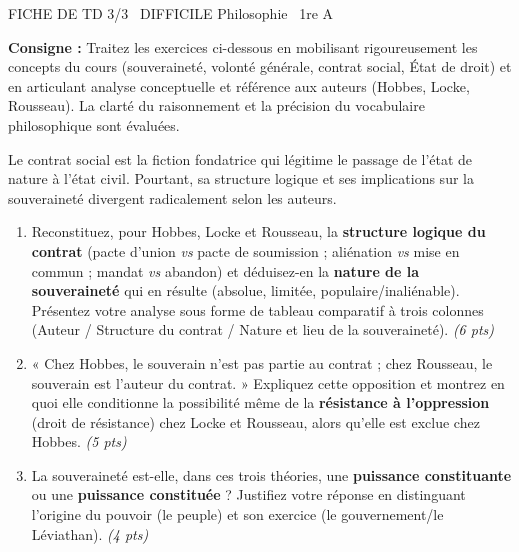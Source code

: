 \documentclass[11pt]{article}
\begin{document}
\begin{tcolorbox}[enhanced,colback=popink,colframe=popink,arc=10pt,boxrule=0pt,left=12pt,right=12pt,top=9pt,bottom=9pt]
{\color{white}\popxbold\small FICHE DE TD 3/3 \textbullet\ DIFFICILE \hfill Philosophie \textbullet\ 1re A\par}
\end{tcolorbox}
\vspace{4pt}
\noindent\textbf{Consigne :} Traitez les exercices ci-dessous en mobilisant rigoureusement les concepts du cours (souveraineté, volonté générale, contrat social, État de droit) et en articulant analyse conceptuelle et référence aux auteurs (Hobbes, Locke, Rousseau). La clarté du raisonnement et la précision du vocabulaire philosophique sont évaluées.

\begin{exercice}
Le contrat social est la fiction fondatrice qui légitime le passage de l'état de nature à l'état civil. Pourtant, sa structure logique et ses implications sur la souveraineté divergent radicalement selon les auteurs.

\begin{enumerate}
    \item Reconstituez, pour Hobbes, Locke et Rousseau, la \textbf{structure logique du contrat} (pacte d'union \textit{vs} pacte de soumission ; aliénation \textit{vs} mise en commun ; mandat \textit{vs} abandon) et déduisez-en la \textbf{nature de la souveraineté} qui en résulte (absolue, limitée, populaire/inaliénable). Présentez votre analyse sous forme de tableau comparatif à trois colonnes (Auteur / Structure du contrat / Nature et lieu de la souveraineté). \textit{(6 pts)}
    \item « Chez Hobbes, le souverain n'est pas partie au contrat ; chez Rousseau, le souverain est l'auteur du contrat. » Expliquez cette opposition et montrez en quoi elle conditionne la possibilité même de la \textbf{résistance à l'oppression} (droit de résistance) chez Locke et Rousseau, alors qu'elle est exclue chez Hobbes. \textit{(5 pts)}
    \item La souveraineté est-elle, dans ces trois théories, une \textbf{puissance constituante} ou une \textbf{puissance constituée} ? Justifiez votre réponse en distinguant l'origine du pouvoir (le peuple) et son exercice (le gouvernement/le Léviathan). \textit{(4 pts)}
\end{enumerate}
\end{exercice}
\end{document}
